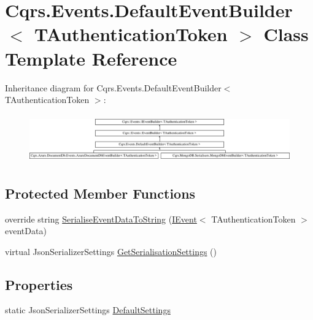 \hypertarget{classCqrs_1_1Events_1_1DefaultEventBuilder}{}\section{Cqrs.\+Events.\+Default\+Event\+Builder$<$ T\+Authentication\+Token $>$ Class Template Reference}
\label{classCqrs_1_1Events_1_1DefaultEventBuilder}
Inheritance diagram for Cqrs.\+Events.\+Default\+Event\+Builder$<$ T\+Authentication\+Token $>$\+:\begin{figure}[H]
\begin{center}
\leavevmode
\includegraphics[height=2.117202cm]{classCqrs_1_1Events_1_1DefaultEventBuilder}
\end{center}
\end{figure}
\subsection*{Protected Member Functions}
\begin{DoxyCompactItemize}
\item 
override string \hyperlink{classCqrs_1_1Events_1_1DefaultEventBuilder_afb73a13003a94135e5c97436e7e78e13_afb73a13003a94135e5c97436e7e78e13}{Serialise\+Event\+Data\+To\+String} (\hyperlink{interfaceCqrs_1_1Events_1_1IEvent}{I\+Event}$<$ T\+Authentication\+Token $>$ event\+Data)
\item 
virtual Json\+Serializer\+Settings \hyperlink{classCqrs_1_1Events_1_1DefaultEventBuilder_a49be2758fa32166f1b95e8c0eb9355d1_a49be2758fa32166f1b95e8c0eb9355d1}{Get\+Serialisation\+Settings} ()
\end{DoxyCompactItemize}
\subsection*{Properties}
\begin{DoxyCompactItemize}
\item 
static Json\+Serializer\+Settings \hyperlink{classCqrs_1_1Events_1_1DefaultEventBuilder_aabead59863bacfed527d85ea789ab881_aabead59863bacfed527d85ea789ab881}{Default\+Settings}
\end{DoxyCompactItemize}
